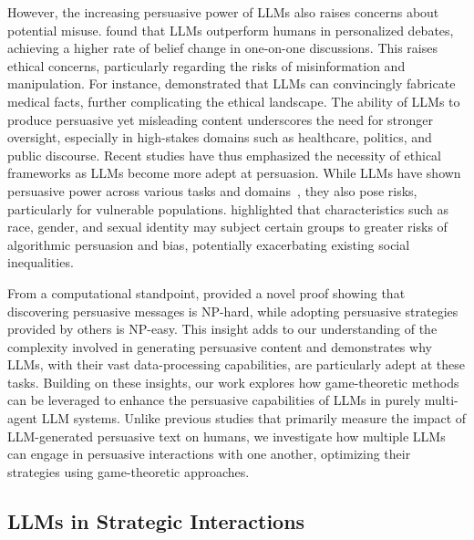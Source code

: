 However, the increasing persuasive power of LLMs also raises concerns about potential misuse. 
\citet{salvi2024conversational} found that LLMs outperform humans in personalized debates, achieving a higher rate of belief change in one-on-one discussions. 
This raises ethical concerns, particularly regarding the risks of misinformation and manipulation. 
For instance, \citet{majovsky2023artificial} demonstrated that LLMs can convincingly fabricate medical facts, further complicating the ethical landscape. 
The ability of LLMs to produce persuasive yet misleading content underscores the need for stronger oversight, especially in high-stakes domains such as healthcare, politics, and public discourse.
Recent studies have thus emphasized the necessity of ethical frameworks as LLMs become more adept at persuasion. 
While LLMs have shown persuasive power across various tasks and domains~\citep{matz2024potential,durmus2024persuasion,burtell2023artificial,shin2023enhancing}, they also pose risks, particularly for vulnerable populations. 
\citet{bar2023algorithmic} highlighted that characteristics such as race, gender, and sexual identity may subject certain groups to greater risks of algorithmic persuasion and bias, potentially exacerbating existing social inequalities. 

From a computational standpoint, \citet{wojtowicz2024and} provided a novel proof showing that discovering persuasive messages is NP-hard, while adopting persuasive strategies provided by others is NP-easy. 
This insight adds to our understanding of the complexity involved in generating persuasive content and demonstrates why LLMs, with their vast data-processing capabilities, are particularly adept at these tasks.
Building on these insights, our work explores how game-theoretic methods can be leveraged to enhance the persuasive capabilities of LLMs in purely multi-agent LLM systems. 
Unlike previous studies that primarily measure the impact of LLM-generated persuasive text on humans, we investigate how multiple LLMs can engage in persuasive interactions with one another, optimizing their strategies using game-theoretic approaches.

\subsection{LLMs in Strategic Interactions}

